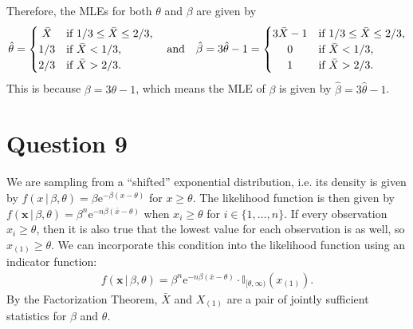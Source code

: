 \documentclass[10pt]{article}
\begin{document}
Therefore, the MLEs for both \(\theta\) and \(\beta\) are given by 
\begin{align*}
    \hat{\theta} 
    = \begin{cases}
        \hfil \bar{X} & \text{if \(1/3 \le \bar{X} \le 2/3\)}, \\
        1/3 & \text{if \(\bar{X} < 1/3\)}, \\
        2/3 & \text{if \(\bar{X} > 2/3\)}.
    \end{cases}
    ~~~\text{and}~~~
    \hat{\beta}
    = 3 \hat{\theta} - 1
    = \begin{cases}
        3\bar{X} - 1 & \text{if \(1/3 \le \bar{X} \le 2/3\)}, \\
        \hfil 0 & \text{if \(\bar{X} < 1/3\)}, \\
        \hfil 1 & \text{if \(\bar{X} > 2/3\)}.
    \end{cases}
\end{align*}
This is because \(\beta = 3 \theta - 1\), which means the MLE of \(\beta\) is given by \(\hat{\beta} = 3 \hat{\theta} - 1\).

\section{Question 9} \noindent
We are sampling from a ``shifted'' exponential distribution, i.e. its density is given by \(f(x \,|\, \beta, \theta) = \beta \mathrm{e}^{-\beta (x - \theta)}\)
for \(x \ge \theta\). The likelihood function is then given by \(f(\mathbf{x} \,|\, \beta, \theta) = \beta^n \mathrm{e}^{-n \beta (\bar{x} - \theta)}\) when
\(x_i \ge \theta \) for \(i \in \{1, \ldots, n\}\). If every observation \(x_i \ge \theta\), then it is also true that the lowest value for each observation
is as well, so \(x_{(1)} \ge \theta\). We can incorporate this condition into the likelihood function using an indicator function:
\begin{align*}
    f(\mathbf{x} \,|\, \beta, \theta) 
    = \beta^n \mathrm{e}^{-n \beta (\bar{x} - \theta)} \cdot \mathbb{I}_{[\theta, \infty)}(x_{(1)}).
\end{align*}
By the Factorization Theorem, \(\bar{X}\) and \(X_{(1)}\) are a pair of jointly sufficient statistics for \(\beta\) and \(\theta\). 
\end{document}
